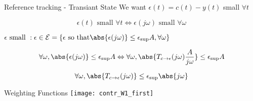 \documentclass[../main/main.tex]{subfiles}
\begin{document}
\begin{frame}{Reference tracking - Transiant State}
  We want \(\epsilon(t) = c(t) - y(t)\) small \(\forall t\)

  \begin{tcolorbox}[size=small, top=4pt,
    colback=blue!5!white,colframe=blue!75!black,title=Duality Time -Frequency]
    \[
      \epsilon(t) \text{ small } \forall t \Longleftrightarrow \epsilon(j\omega)
      \text{ small } \forall \omega
    \]
  \end{tcolorbox}

  $\epsilon \text{ small }: \epsilon \in \mathcal{E} = \left\{ \epsilon\text{ so that} \abs{\epsilon(j\omega)} \le \epsilon_{\text{sup}}A, \forall \omega \right\}$

  \begin{equation*}
    \forall \omega, \abs{\epsilon(j\omega)} \le \epsilon_{\text{sup}}A \Leftrightarrow \forall \omega, \abs{T_{c\rightarrow\epsilon}(j\omega) \frac{A}{j\omega}} \le \epsilon_{\text{sup}}A
  \end{equation*} 

  \begin{tcolorbox}[size=small, top=4pt,
    colback=red!5!white,colframe=red!75!black,title=If we want small error
    during transiant state]
    \[
      \forall \omega, \abs{T_{c\rightarrow\epsilon}(j\omega)} \le \epsilon_{\text{sup}}\abs{j\omega}
    \]
  \end{tcolorbox}
\end{frame}


\begin{frame}{Weighting Functions}
  \centering
  \texttt{[image: contr\_W1\_first]}
\end{frame}
\end{document}
